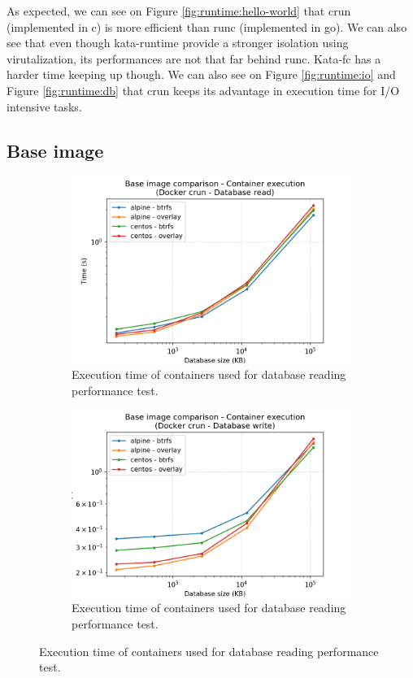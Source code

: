 As expected, we can see on Figure \ref{fig:runtime:hello-world} that crun (implemented in c) is more efficient than runc (implemented in go).  We can also see that even though kata-runtime provide a stronger isolation using virutalization, its performances are not that far behind runc.  Kata-fc has a harder time keeping up though.  We can also see on Figure \ref{fig:runtime:io} and Figure \ref{fig:runtime:db} that crun keeps its advantage in execution time for I/O intensive tasks.

\clearpage
\subsection{Base image}
\begin{figure}[h!]
    \begin{subfigure}{.5\textwidth}
      \centering
      \includegraphics[width=\linewidth]{images/image/image-execution-Docker-crun---Database-read.png}
      \caption{Execution time of containers used for database reading performance test.}
      \label{fig:image:db-read-exec}
    \end{subfigure}
    \begin{subfigure}{.5\textwidth}
      \centering
      \includegraphics[width=\linewidth]{images/image/image-execution-Docker-crun---Database-write.png}
      \caption{Execution time of containers used for database reading performance test.}
      \label{fig:image:db-write-exec}
    \end{subfigure}
    

\end{figure}
